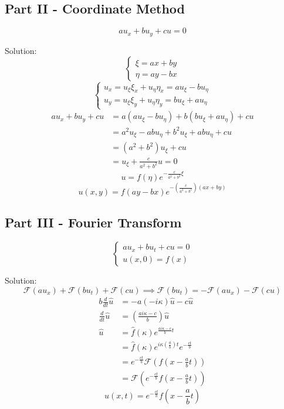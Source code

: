 \documentclass[12pt]{article}
\renewcommand{\hat}[1]{\widehat{#1}}
\newcommand{\F}{\mathcal{F}}
\begin{document}
\subsection*{Part II - Coordinate Method}
\[au_x + bu_y + cu = 0\]

Solution:
\[\begin{cases}
    \xi = ax + by\\
    \eta = ay - bx
\end{cases}\]
\[\begin{cases}
    u_x = u_\xi \xi_x + u_\eta \eta_x = au_\xi -bu_\eta\\
    u_y = u_\xi \xi_y + u_\eta \eta_y = bu_\xi + au_\eta
\end{cases}\]
\begin{align*}
    au_x + bu_y + cu &= a(au_\xi -bu_\eta) + b(bu_\xi + au_\eta) + cu\\
    &= a^2u_\xi - abu_\eta + b^2 u_\xi + abu_\eta + cu\\
    &= (a^2 + b^2) u_\xi + cu\\
    &= u_\xi + \frac{c}{a^2 + b^2}u = 0
\end{align*}
\[u = f(\eta)e^{-\frac{c}{a^2 + b^2}\xi}\]
\[\boxed{u(x, y) = f(ay -bx)e^{-\left(\frac{c}{a^2 + b^2}\right)(ax + by)}}\]

\subsection*{Part III - Fourier Transform}
\[\begin{cases}
    au_x + bu_t + cu = 0\\
    u(x, 0) = f(x)
\end{cases}\]

Solution:
\[\F(au_x) + \F(bu_t) + \F(cu) \implies \F(bu_t) = -\F(au_x) -\F(cu)\]
\begin{align*}
    b\frac{d}{dt}\hat{u} &= -a(-i\kappa)\hat{u} - c\hat{u} \\
    \frac{d}{dt}\hat{u} &= \left(\frac{ai\kappa - c}{b}\right)\hat{u} \\
    \hat{u} &= \hat{f}(\kappa)e^{\frac{ai\kappa - c}{b}t}\\
    &= \hat{f}(\kappa)e^{i\kappa\left(\frac{a}{b}\right)t} e^{-\frac{ct}{b}}\\
    &= e^{-\frac{ct}{b}} \F\left(f(x - \frac{a}{b}t)\right)\\
    &= \F\left(e^{-\frac{ct}{b}}f(x - \frac{a}{b}t)\right)
\end{align*}
\[\boxed{u(x, t) = e^{-\frac{ct}{b}}f(x - \frac{a}{b}t)}\]
\end{document}
